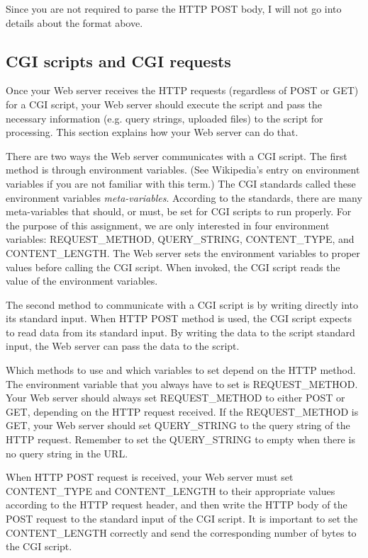 \documentclass[a4paper,11pt]{exam}
\begin{document}
Since you are not required to parse the HTTP POST body, I will not go into details about the format above.

\subsection*{CGI scripts and CGI requests}

Once your Web server receives the HTTP requests (regardless of POST or GET) for a CGI script, your Web server should execute the script and pass the necessary information (e.g. query strings, uploaded files) to the script for processing. This section explains how your Web server can do that.

There are two ways the Web server communicates with a CGI script. The first method is through environment variables. (See Wikipedia's entry on environment variables if you are not familiar with this term.) The CGI standards called these environment variables \textit{meta-variables}. According to the standards, there are many meta-variables that should, or must, be set for CGI scripts to run properly. For the purpose of this assignment, we are only interested in four environment variables: REQUEST\_METHOD, QUERY\_STRING, CONTENT\_TYPE, and CONTENT\_LENGTH. The Web server sets the environment variables to proper values before calling the CGI script. When invoked, the CGI script reads the value of the environment variables.

The second method to communicate with a CGI script is by writing directly into its standard input. When HTTP POST method is used, the CGI script expects to read data from its standard input. By writing the data to the script standard input, the Web server can pass the data to the script.

Which methods to use and which variables to set depend on the HTTP method. The environment variable that you always have to set is REQUEST\_METHOD. Your Web server should always set REQUEST\_METHOD to either POST or GET, depending on the HTTP request received. If the REQUEST\_METHOD is GET, your Web server should set QUERY\_STRING to the query string of the HTTP request. Remember to set the QUERY\_STRING to empty when there is no query string in the URL.

When HTTP POST request is received, your Web server must set CONTENT\_TYPE and CONTENT\_LENGTH to their appropriate values according to the HTTP request header, and then write the HTTP body of the POST request to the standard input of the CGI script. It is important to set the CONTENT\_LENGTH correctly and send the corresponding number of bytes to the CGI script.
\end{document}
